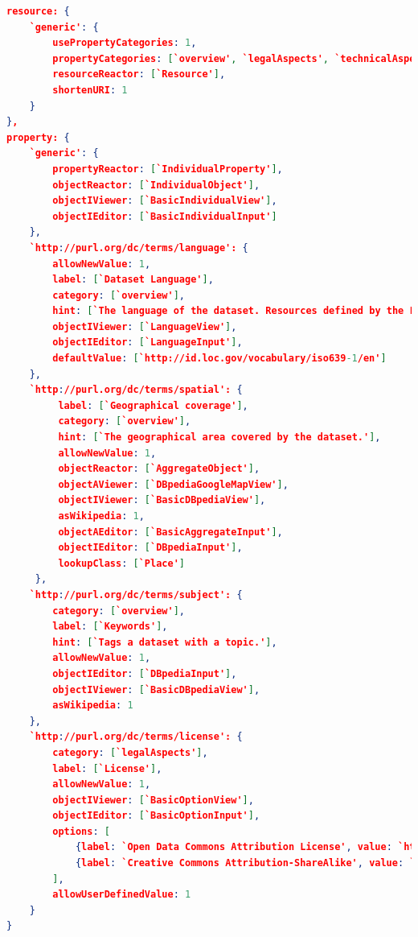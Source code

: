 \documentclass{acm_proc_article-sp}
\begin{document}
\begin{lstlisting}[language=json,firstnumber=1, label=code:config, caption=An excerpt of the LD-R configuration for RISIS.]
resource: {
    `generic': {
        usePropertyCategories: 1,
        propertyCategories: [`overview', `legalAspects', `technicalAspects'],
        resourceReactor: [`Resource'],
        shortenURI: 1
    }
},
property: {
    `generic': {
        propertyReactor: [`IndividualProperty'],
        objectReactor: [`IndividualObject'],
        objectIViewer: [`BasicIndividualView'],
        objectIEditor: [`BasicIndividualInput']
    },
    `http://purl.org/dc/terms/language': {
        allowNewValue: 1,
        label: [`Dataset Language'],
        category: [`overview'],
        hint: [`The language of the dataset. Resources defined by the Library of Congress (http://id.loc.gov/vocabulary/iso639-1.html, http://id.loc.gov/vocabulary/iso639-2.html) SHOULD be used.'],
        objectIViewer: [`LanguageView'],
        objectIEditor: [`LanguageInput'],
        defaultValue: [`http://id.loc.gov/vocabulary/iso639-1/en']
    },
    `http://purl.org/dc/terms/spatial': {
         label: [`Geographical coverage'],
         category: [`overview'],
         hint: [`The geographical area covered by the dataset.'],
         allowNewValue: 1,
         objectReactor: [`AggregateObject'],
         objectAViewer: [`DBpediaGoogleMapView'],
         objectIViewer: [`BasicDBpediaView'],
         asWikipedia: 1,
         objectAEditor: [`BasicAggregateInput'],
         objectIEditor: [`DBpediaInput'],
         lookupClass: [`Place']
     },
    `http://purl.org/dc/terms/subject': {
        category: [`overview'],
        label: [`Keywords'],
        hint: [`Tags a dataset with a topic.'],
        allowNewValue: 1,
        objectIEditor: [`DBpediaInput'],
        objectIViewer: [`BasicDBpediaView'],
        asWikipedia: 1
    },
    `http://purl.org/dc/terms/license': {
        category: [`legalAspects'],
        label: [`License'],
        allowNewValue: 1,
        objectIViewer: [`BasicOptionView'],
        objectIEditor: [`BasicOptionInput'],
        options: [
            {label: `Open Data Commons Attribution License', value: `http://www.opendatacommons.org/licenses/by/'},
            {label: `Creative Commons Attribution-ShareAlike', value: `http://creativecommons.org/licenses/by-sa/3.0/'}
        ],
        allowUserDefinedValue: 1
    }   
}
\end{lstlisting}
\end{document}
